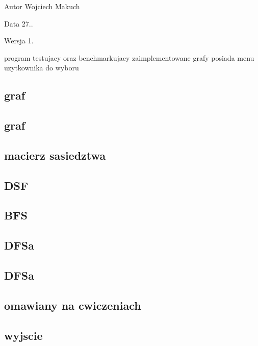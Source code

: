 \begin{DoxyAuthor}{Autor}
Wojciech Makuch 
\end{DoxyAuthor}
\begin{DoxyDate}{Data}
27.. 
\end{DoxyDate}
\begin{DoxyVersion}{Wersja}
1.
\end{DoxyVersion}
program testujacy oraz benchmarkujacy zaimplementowane grafy posiada menu uzytkownika do wyboru \hypertarget{index_utworz}{}\subsection{graf}\label{index_utworz}
\hypertarget{index_utworz}{}\subsection{graf}\label{index_utworz}
\hypertarget{index_wyswietl}{}\subsection{macierz sasiedztwa}\label{index_wyswietl}
\hypertarget{index_DSF}{}\subsection{D\+S\+F}\label{index_DSF}
\hypertarget{index_BFS}{}\subsection{B\+F\+S}\label{index_BFS}
\hypertarget{index_benchmarkuj}{}\subsection{D\+F\+Sa}\label{index_benchmarkuj}
\hypertarget{index_benchmarkuj}{}\subsection{D\+F\+Sa}\label{index_benchmarkuj}
\hypertarget{index_graf}{}\subsection{omawiany na cwiczeniach}\label{index_graf}
\hypertarget{main.cpp_wyjscie}{}\subsection{wyjscie}\label{main.cpp_wyjscie}
